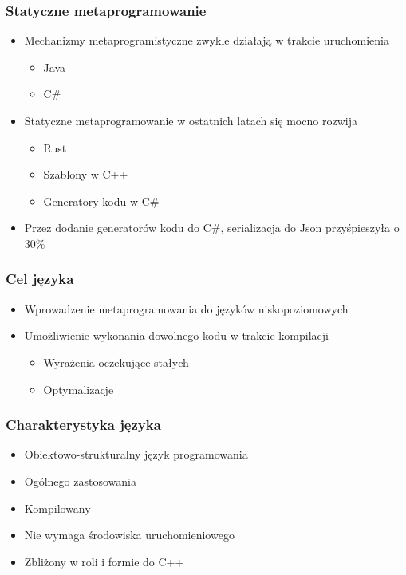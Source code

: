 \begin{frame}
	\frametitle{Statyczne metaprogramowanie}

	\begin{itemize}
		\item Mechanizmy metaprogramistyczne zwykle działają w trakcie uruchomienia\begin{itemize}
			\item Java
			\item C\#
		\end{itemize}
		\item Statyczne metaprogramowanie w ostatnich latach się mocno rozwija\begin{itemize}
			\item Rust
			\item Szablony w C++
			\item Generatory kodu w C\#
		\end{itemize}
		\item Przez dodanie generatorów kodu do C\#, serializacja do Json przyśpieszyła o 30\%
	\end{itemize}

\end{frame}

\begin{frame}
	\frametitle{Cel języka}

	\begin{itemize}
		\item Wprowadzenie metaprogramowania do języków niskopoziomowych
		\item Umożliwienie wykonania dowolnego kodu w trakcie kompilacji\begin{itemize}
			\item Wyrażenia oczekujące stałych
			\item Optymalizacje
		\end{itemize}
	\end{itemize}

\end{frame}

\begin{frame}
	\frametitle{Charakterystyka języka}

	\begin{itemize}
		\item Obiektowo-strukturalny język programowania
		\item Ogólnego zastosowania
		\item Kompilowany
		\item Nie wymaga środowiska uruchomieniowego
		\item Zbliżony w roli i formie do C++
	\end{itemize}

\end{frame}

